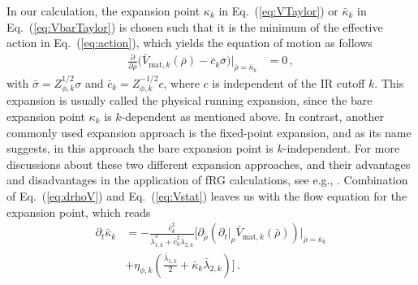 \documentclass[%
reprint,
superscriptaddress,
showpacs,preprintnumbers,
 amsmath,amssymb,
 aps,
prd,
]{revtex4-1}
\def\Eq#1{Eq.~(\ref{#1})}
\begin{document}
In our calculation, the expansion point $\kappa_k$ in \Eq{eq:VTaylor} or $\bar \kappa_k$ in \Eq{eq:VbarTaylor} is chosen such that it is the minimum of the effective action in \Eq{eq:action}, which yields the equation of motion as follows
%
\begin{align}
  \frac{\partial}{\partial \bar \rho}\Big(\bar V_{\mathrm{mat}, k}(\bar \rho)-\bar c_k
  \bar \sigma \Big)\bigg \vert_{\bar\rho=\bar \kappa_k}&=0\,, \label{eq:Vstat}
\end{align}
%
with $ \bar \sigma=Z_{\phi,k}^{1/2} \sigma$ and $\bar c_k=Z_{\phi,k}^{-1/2} c$, where $c$ is independent of the IR cutoff $k$. This expansion is usually called the physical running expansion, since the bare expansion point $\kappa_k$ is $k$-dependent as mentioned above. In contrast, another commonly used expansion approach is the fixed-point expansion, and as its name suggests, in this approach the bare expansion point is $k$-independent. For more discussions about these two different expansion approaches, and their advantages and disadvantages in the application of fRG calculations, see e.g.,  \cite{Pawlowski:2014zaa,Braun:2014ata, Fu:2015naa, Rennecke:2016tkm,Yin:2019ebz}. Combination of \Eq{eq:drhoV} and \Eq{eq:Vstat} leaves us with the flow equation for the expansion point, which reads
%
\begin{align}
  \partial_t \bar \kappa_k&=-\frac{\bar c_k^2}{\bar{\lambda}_{1,k}^3+\bar c_k^2\bar{\lambda}_{2,k}}\bigg[\partial_{\bar \rho}\left(\partial_t\big|_{\rho} \bar V_{\mathrm{mat}, k}(\bar \rho)\right)\Big|_{\bar \rho=\bar \kappa_k}\nonumber \\[2ex]
          &+\eta_{\phi,k}\left(\frac{\bar{\lambda}_{1,k}}{2}+\bar\kappa_k\bar{\lambda}_{2,k}\right)\bigg]\,.\label{eq:flowkappa}
\end{align}
%
\end{document}

